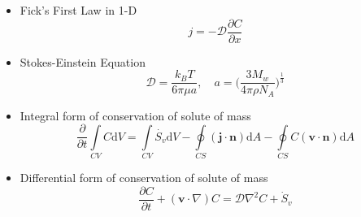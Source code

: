 \documentclass[11pt,a4paper]{article}
\begin{document}
\begin{itemize}
    \item Fick's First Law in 1-D
    \[j = -\mathcal{D}\frac{\partial C}{\partial x}\]
    
    \item Stokes-Einstein Equation 
    \[
    \mathcal{D}=\frac{k_{B}T}{6\pi \mu a}, \quad 
    a = \bigg(\frac{3M_w}{4\pi \rho N_A}\bigg)^{\frac{1}{3}}
    \]
    
    \item Integral form of conservation of solute of mass 
    \[
        \frac{\partial}{\partial t} \int\limits_{CV} C \mathrm{d}V = \int\limits_{CV} \dot{S_{v}} \mathrm{d}V - \oint\limits_{CS} (\mathbf{j} \cdot \mathbf{n}) \mathrm{d}A - \oint\limits_{CS} C (\mathbf{v} \cdot \mathbf{n}) \mathrm{d}A 
    \]
    
    \item Differential form of conservation of solute of mass
    \[
        \frac{\partial C}{\partial t} + (\mathbf{v} \cdot \nabla)C = \mathcal{D}\nabla^2 C + \dot{S}_{v}
    \]
\end{itemize}
\vspace*{\fill}
\end{document}
